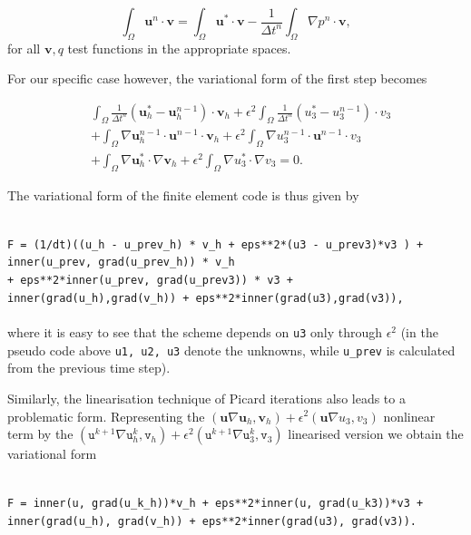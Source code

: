 \documentclass[12pt]{report}
\numberwithin{theorem}{chapter}
\numberwithin{corollary}{chapter}
\numberwithin{lemma}{chapter}
\numberwithin{remark}{chapter}
\numberwithin{definition}{chapter}
\numberwithin{prop}{chapter}
\begin{document}
$$ \int_\Omega \mathbf{u}^n\cdot \mathbf{v} = \int_\Omega \mathbf{u}^* \cdot \mathbf{v} - \frac{1}{\Delta t^n} \int_\Omega \nabla p^n \cdot \mathbf{v},$$
%
for all $\mathbf{v}, q$ test functions in the appropriate spaces.

For our specific case however, the variational form of the first step becomes

\begin{equation}
\begin{split}
& \int_\Omega \frac{1}{\Delta t^n} (\mathbf{u}_h^* - \mathbf{u}_h^{n-1}) \cdot \mathbf{v}_h + \epsilon^2 \int_\Omega \frac{1}{\Delta t^n} (u_3^* - u_3^{n-1}) \cdot v_3 \\
& + \int_\Omega \nabla \mathbf{u}_h^{n-1} \cdot \mathbf{u}^{n-1} \cdot \mathbf{v}_h + \epsilon^2 \int_\Omega \nabla u_3^{n-1} \cdot \mathbf{u}^{n-1} \cdot v_3 \\
& + \int_\Omega \nabla \mathbf{u}_h^* \cdot \nabla \mathbf{v}_h + \epsilon^2 \int_\Omega \nabla u_3^* \cdot \nabla v_3 = 0.
\end{split}
\end{equation}

The variational form of the finite element code is thus given by

\texttt{
\\
F = (1/dt)((u\_h - u\_prev\_h) * v\_h + eps**2*(u3 - u\_prev3)*v3 ) + \\
inner(u\_prev, grad(u\_prev\_h)) * v\_h\\
 + eps**2*inner(u\_prev, grad(u\_prev3)) * v3 + \\
 inner(grad(u\_h),grad(v\_h)) + eps**2*inner(grad(u3),grad(v3)), \\
\\ 
}
%
where it is easy to see that the scheme depends on \texttt{u3} only through $\epsilon^2$ (in the pseudo code above \texttt{u1, u2, u3} denote the unknowns, while \texttt{u\_prev} is calculated from the previous time step).

Similarly, the linearisation technique of Picard iterations also leads to a problematic form. Representing the $(\mathbf{u} \nabla \mathbf{u}_h, \mathbf{v}_h) + \epsilon^2 ( \mathbf{u} \nabla u_3, v_3)$ nonlinear term by the $( \texttt{u}^{k+1} \nabla \texttt{u}_h^k, \texttt{v}_h ) + \epsilon^2 (\texttt{u}^{k+1} \nabla \texttt{u}_3^k, \texttt{v}_3 )$  linearised version we obtain the variational form

\texttt{
\\
F = inner(u, grad(u\_k\_h))*v\_h + eps**2*inner(u, grad(u\_k3))*v3 + \\
inner(grad(u\_h), grad(v\_h)) + eps**2*inner(grad(u3), grad(v3)).\\
}
\end{document}
